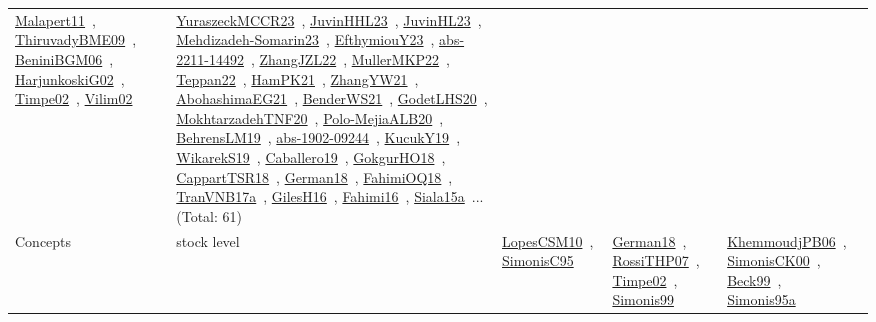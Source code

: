 {\begin{longtable}{lp{3cm}>{\raggedright\arraybackslash}p{6cm}>{\raggedright\arraybackslash}p{6cm}>{\raggedright\arraybackslash}p{8cm}}
\href{works/Malapert11.pdf}{Malapert11}~\cite{Malapert11}, \href{works/ThiruvadyBME09.pdf}{ThiruvadyBME09}~\cite{ThiruvadyBME09}, \href{works/BeniniBGM06.pdf}{BeniniBGM06}~\cite{BeniniBGM06}, \href{works/HarjunkoskiG02.pdf}{HarjunkoskiG02}~\cite{HarjunkoskiG02}, \href{works/Timpe02.pdf}{Timpe02}~\cite{Timpe02}, \href{works/Vilim02.pdf}{Vilim02}~\cite{Vilim02} & \href{works/YuraszeckMCCR23.pdf}{YuraszeckMCCR23}~\cite{YuraszeckMCCR23}, \href{works/JuvinHHL23.pdf}{JuvinHHL23}~\cite{JuvinHHL23}, \href{works/JuvinHL23.pdf}{JuvinHL23}~\cite{JuvinHL23}, \href{works/Mehdizadeh-Somarin23.pdf}{Mehdizadeh-Somarin23}~\cite{Mehdizadeh-Somarin23}, \href{works/EfthymiouY23.pdf}{EfthymiouY23}~\cite{EfthymiouY23}, \href{works/abs-2211-14492.pdf}{abs-2211-14492}~\cite{abs-2211-14492}, \href{works/ZhangJZL22.pdf}{ZhangJZL22}~\cite{ZhangJZL22}, \href{works/MullerMKP22.pdf}{MullerMKP22}~\cite{MullerMKP22}, \href{works/Teppan22.pdf}{Teppan22}~\cite{Teppan22}, \href{works/HamPK21.pdf}{HamPK21}~\cite{HamPK21}, \href{works/ZhangYW21.pdf}{ZhangYW21}~\cite{ZhangYW21}, \href{works/AbohashimaEG21.pdf}{AbohashimaEG21}~\cite{AbohashimaEG21}, \href{works/BenderWS21.pdf}{BenderWS21}~\cite{BenderWS21}, \href{works/GodetLHS20.pdf}{GodetLHS20}~\cite{GodetLHS20}, \href{works/MokhtarzadehTNF20.pdf}{MokhtarzadehTNF20}~\cite{MokhtarzadehTNF20}, \href{works/Polo-MejiaALB20.pdf}{Polo-MejiaALB20}~\cite{Polo-MejiaALB20}, \href{works/BehrensLM19.pdf}{BehrensLM19}~\cite{BehrensLM19}, \href{works/abs-1902-09244.pdf}{abs-1902-09244}~\cite{abs-1902-09244}, \href{works/KucukY19.pdf}{KucukY19}~\cite{KucukY19}, \href{works/WikarekS19.pdf}{WikarekS19}~\cite{WikarekS19}, \href{works/Caballero19.pdf}{Caballero19}~\cite{Caballero19}, \href{works/GokgurHO18.pdf}{GokgurHO18}~\cite{GokgurHO18}, \href{works/CappartTSR18.pdf}{CappartTSR18}~\cite{CappartTSR18}, \href{works/German18.pdf}{German18}~\cite{German18}, \href{works/FahimiOQ18.pdf}{FahimiOQ18}~\cite{FahimiOQ18}, \href{works/TranVNB17a.pdf}{TranVNB17a}~\cite{TranVNB17a}, \href{works/GilesH16.pdf}{GilesH16}~\cite{GilesH16}, \href{works/Fahimi16.pdf}{Fahimi16}~\cite{Fahimi16}, \href{works/Siala15a.pdf}{Siala15a}~\cite{Siala15a}... (Total: 61)\\
Concepts & stock level & \href{works/LopesCSM10.pdf}{LopesCSM10}~\cite{LopesCSM10}, \href{works/SimonisC95.pdf}{SimonisC95}~\cite{SimonisC95} & \href{works/German18.pdf}{German18}~\cite{German18}, \href{works/RossiTHP07.pdf}{RossiTHP07}~\cite{RossiTHP07}, \href{works/Timpe02.pdf}{Timpe02}~\cite{Timpe02}, \href{works/Simonis99.pdf}{Simonis99}~\cite{Simonis99} & \href{works/KhemmoudjPB06.pdf}{KhemmoudjPB06}~\cite{KhemmoudjPB06}, \href{works/SimonisCK00.pdf}{SimonisCK00}~\cite{SimonisCK00}, \href{works/Beck99.pdf}{Beck99}~\cite{Beck99}, \href{works/Simonis95a.pdf}{Simonis95a}~\cite{Simonis95a}\\

\end{longtable}}
